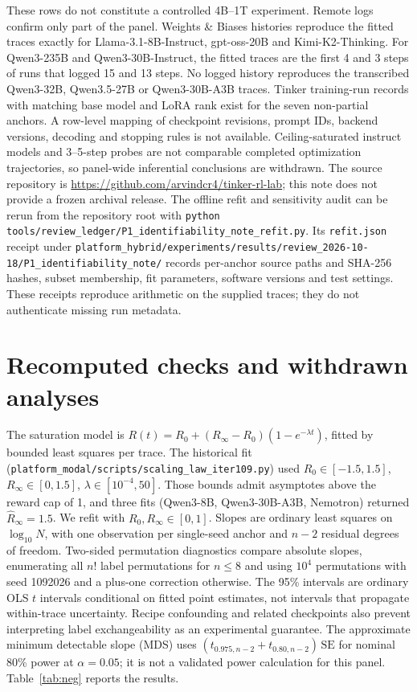 \documentclass[11pt]{article}
\begin{document}
These rows do not constitute a controlled 4B--1T experiment. Remote logs confirm
only part of the panel. Weights \& Biases histories reproduce the fitted traces
exactly for Llama-3.1-8B-Instruct, gpt-oss-20B and Kimi-K2-Thinking. For
Qwen3-235B and Qwen3-30B-Instruct, the fitted traces are the first 4 and 3 steps
of runs that logged 15 and 13 steps. No logged history reproduces the
transcribed Qwen3-32B, Qwen3.5-27B or Qwen3-30B-A3B traces. Tinker training-run
records with matching base model and LoRA rank exist for the seven non-partial
anchors. A row-level mapping of checkpoint revisions, prompt IDs, backend
versions, decoding and stopping rules is not available. Ceiling-saturated
instruct models and 3--5-step probes are not comparable completed optimization
trajectories, so panel-wide inferential conclusions are withdrawn. The source
repository is \url{https://github.com/arvindcr4/tinker-rl-lab}; this note does
not provide a frozen archival release. The offline refit and sensitivity audit
can be rerun from the repository root with
\texttt{python tools/review\_ledger/}\allowbreak\texttt{P1\_identifiability\_note\_refit.py}.
Its \texttt{refit.json} receipt under
\nolinkurl{platform_hybrid/experiments/results/review_2026-10-18/P1_identifiability_note/}
records per-anchor source paths and SHA-256 hashes, subset membership, fit
parameters, software versions and test settings. These receipts reproduce
arithmetic on the supplied traces; they do not authenticate missing run metadata.

\section{Recomputed checks and withdrawn analyses}

The saturation model is $R(t)=R_0+(R_\infty-R_0)(1-e^{-\lambda t})$, fitted by
bounded least squares per trace. The historical fit
(\nolinkurl{platform_modal/scripts/scaling_law_iter109.py}) used
$R_0\in[-1.5,1.5]$, $R_\infty\in[0,1.5]$, $\lambda\in[10^{-4},50]$. Those bounds
admit asymptotes above the reward cap of 1, and three fits (Qwen3-8B,
Qwen3-30B-A3B, Nemotron) returned $\hat R_\infty=1.5$. We refit with
$R_0,R_\infty\in[0,1]$. Slopes are ordinary least squares on $\log_{10}N$,
with one observation per single-seed anchor and $n-2$ residual degrees of freedom.
Two-sided permutation diagnostics compare absolute slopes, enumerating all
$n!$ label permutations for $n\le8$ and using $10^4$ permutations with seed
1092026 and a plus-one correction otherwise. The 95\% intervals are ordinary
OLS $t$ intervals conditional on fitted point estimates, not intervals that
propagate within-trace uncertainty. Recipe confounding and related checkpoints
also prevent interpreting label exchangeability as an experimental guarantee.
The approximate minimum detectable slope (MDS) uses
$(t_{0.975,n-2}+t_{0.80,n-2})\,\mathrm{SE}$ for nominal 80\% power at
$\alpha=0.05$; it is not a validated power calculation for this panel.
Table~\ref{tab:neg} reports the results.
\end{document}
